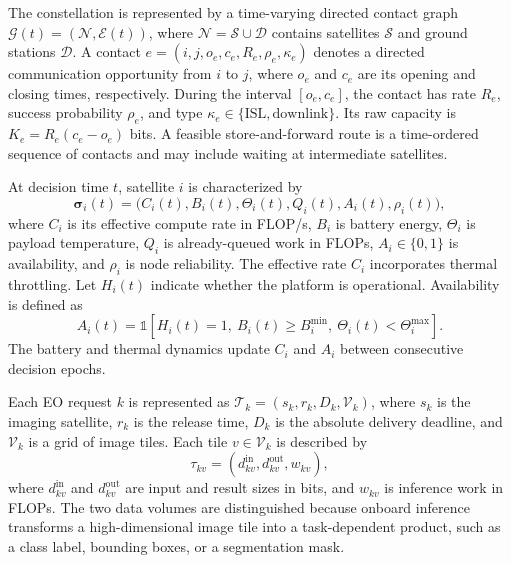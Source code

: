 \documentclass[conference]{IEEEtran}
\begin{document}
The constellation is represented by a time-varying directed contact graph
$\mathcal{G}(t)=(\mathcal{N},\mathcal{E}(t))$, where
$\mathcal{N}=\mathcal{S}\cup\mathcal{D}$ contains satellites
$\mathcal{S}$ and ground stations $\mathcal{D}$. A contact
$e=(i,j,o_e,c_e,R_e,\rho_e,\kappa_e)$ denotes a directed communication
opportunity from $i$ to $j$, where $o_e$ and $c_e$ are its opening and closing
times, respectively. During the interval $[o_e,c_e]$, the contact has rate
$R_e$, success probability $\rho_e$, and type
$\kappa_e\in\{\mathrm{ISL},\mathrm{downlink}\}$. Its raw capacity is
$K_e=R_e(c_e-o_e)$ bits. A feasible store-and-forward route is a
time-ordered sequence of contacts and may include waiting at intermediate
satellites.

At decision time $t$, satellite $i$ is characterized by
\begin{equation}
  \boldsymbol{\sigma}_i(t)
  =\bigl(C_i(t),B_i(t),\Theta_i(t),Q_i(t),A_i(t),\rho_i(t)\bigr),
  \label{eq:satellite-state}
\end{equation}
where $C_i$ is its effective compute rate in FLOP/s, $B_i$ is battery energy,
$\Theta_i$ is payload temperature, $Q_i$ is already-queued work in FLOPs,
$A_i\in\{0,1\}$ is availability, and $\rho_i$ is node reliability. The
effective rate $C_i$ incorporates thermal throttling. Let $H_i(t)$ indicate
whether the platform is operational. Availability is defined as
\begin{equation}
 A_i(t)=
 \mathbb{1}\!\left[
   H_i(t)=1,\ B_i(t)\ge B_i^{\min},\
   \Theta_i(t)<\Theta_i^{\max}
 \right].
 \label{eq:availability}
\end{equation}
The battery and thermal dynamics update $C_i$ and $A_i$ between consecutive
decision epochs.

Each EO request $k$ is represented as
$\mathcal{T}_k=(s_k,r_k,D_k,\mathcal{V}_k)$, where $s_k$ is the imaging
satellite, $r_k$ is the release time, $D_k$ is the absolute delivery deadline,
and $\mathcal{V}_k$ is a grid of image tiles. Each tile $v\in\mathcal{V}_k$ is
described by
\begin{equation}
  \tau_{kv}=(d^{\mathrm{in}}_{kv},d^{\mathrm{out}}_{kv},w_{kv}),
  \label{eq:tile}
\end{equation}
where $d^{\mathrm{in}}_{kv}$ and $d^{\mathrm{out}}_{kv}$ are input and result
sizes in bits, and $w_{kv}$ is inference work in FLOPs.
The two data volumes are distinguished because onboard inference transforms a
high-dimensional image tile into a task-dependent product, such as a class
label, bounding boxes, or a segmentation mask.
\end{document}
